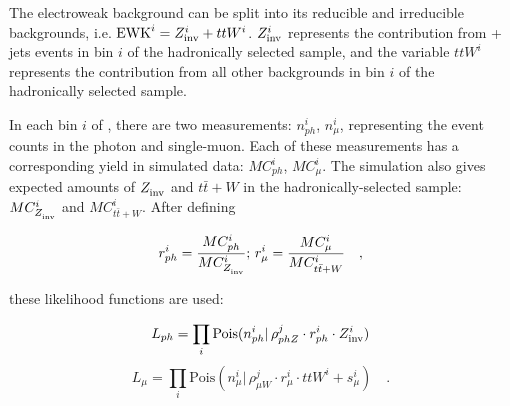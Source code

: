 The electroweak background can be split into its reducible and 
irreducible backgrounds, i.e. $\mathrm{EWK}^i =  Z_{\rm inv}^{i} + ttW^{i}$.
$Z_{\rm inv}^{i}$ represents the contribution from \znunu + jets
events in \HT bin $i$ of the hadronically selected sample, 
and the variable $ttW^{i}$ represents the contribution from 
all other backgrounds in \HT bin $i$ of the hadronically 
selected sample.  
%
%
%

In each bin $i$ of \HT, there are two measurements: $n_{ph}^i$,
$n_{\mu}^i$, representing the event counts in the photon and single-muon.  
Each of these measurements has a corresponding yield in simulated 
data: $MC_{ph}^i$, $MC_{\mu}^i$.  The simulation also 
gives expected amounts of $Z_{\rm inv}^{}$ and $t\bar{t}+W$ in 
the hadronically-selected sample: $MC_{Z_{\rm inv}^{}}^i$ and 
$MC_{t\bar{t}+W}^i$.  After defining

\begin{equation}
r_{ph}^i = \frac{MC_{ph}^i}{MC_{Z_{\rm inv}^{}}^i};\, r_{\mu}^i =
\frac{MC_{\mu}^i}{MC_{t\bar{t}+W}^i}\quad ,
\end{equation}

these likelihood functions are used:

\begin{equation}
\label{eq:photonLikelihood}
L_{ph}= \prod_i \mathrm{Pois}(n_{ph}^i |\, \rho_{phZ}^j \cdot
r_{ph}^{i} \cdot Z_{\rm inv}^{i})
\end{equation}
%
%
\begin{equation}
\label{eq:muonLikelihood}
L_{\mu}=\prod_i \mathrm{Pois}(n_{\mu}^i |\, \rho_{\mu W}^j \cdot
r_{\mu}^{i} \cdot ttW^{i} + s_{\mu}^i)\quad .
\end{equation}

